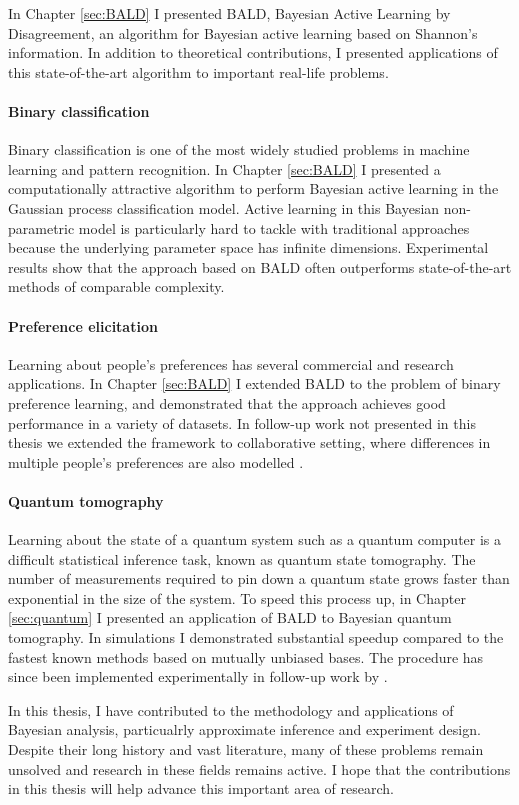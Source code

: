 In Chapter \ref{sec:BALD} I presented BALD, Bayesian Active Learning by Disagreement, an algorithm for Bayesian active learning based on Shannon's information. In addition to theoretical contributions, I presented applications of this state-of-the-art algorithm to important real-life problems.

\paragraph{Binary classification} Binary classification is one of the most widely studied problems in machine learning and pattern recognition. In Chapter \ref{sec:BALD} I presented a computationally attractive algorithm to perform Bayesian active learning in the Gaussian process classification model. Active learning in this Bayesian non-parametric model is particularly hard to tackle with traditional approaches because the underlying parameter space has infinite dimensions. Experimental results show that the approach based on BALD often outperforms state-of-the-art methods of comparable complexity.

\paragraph{Preference elicitation} Learning about people's preferences has several commercial and research applications. In Chapter \ref{sec:BALD} I extended BALD to the problem of binary preference learning, and demonstrated that the approach achieves good performance in a variety of datasets. In follow-up work not presented in this thesis we extended the framework to collaborative setting, where differences in multiple people's preferences are also modelled \citep{Houlsby2012preference}.

\paragraph{Quantum tomography} Learning about the state of a quantum system such as a quantum computer is a difficult statistical inference task, known as quantum state tomography. The number of measurements required to pin down a quantum state grows faster than exponential in the size of the system. To speed this process up, in Chapter \ref{sec:quantum} I presented an application of BALD to Bayesian quantum tomography. In simulations I demonstrated substantial speedup compared to the fastest known methods based on mutually unbiased bases. The procedure has since been implemented experimentally in follow-up work by \citet{Kravtsov2013}.

In this thesis, I have contributed to the methodology and applications of Bayesian analysis, particualrly approximate inference and experiment design. Despite their long history and vast literature, many of these problems remain unsolved and research in these fields remains active. I hope that the contributions in this thesis will help advance this important area of research.